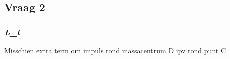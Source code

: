 \documentclass{article}
\begin{document}
\subsection{\textbf{Vraag 2}}
\subsubsection{\textbf{\textit{L\_l}}}
\begin{maplelatex}\begin{Maple Normal}{
}\end{Maple Normal}
\end{maplelatex}
\begin{maplelatex}\begin{Maple Normal}{
Misschien extra term om impuls rond massacentrum D ipv rond punt C}\end{Maple Normal}
\end{maplelatex}
\begin{maplelatex}\begin{Maple Normal}{
}\end{Maple Normal}
\end{maplelatex}
\begin{maplegroup}
\begin{mapleinput}
\end{mapleinput}
\mapleresult
{}
\end{maplegroup}
\end{document}
